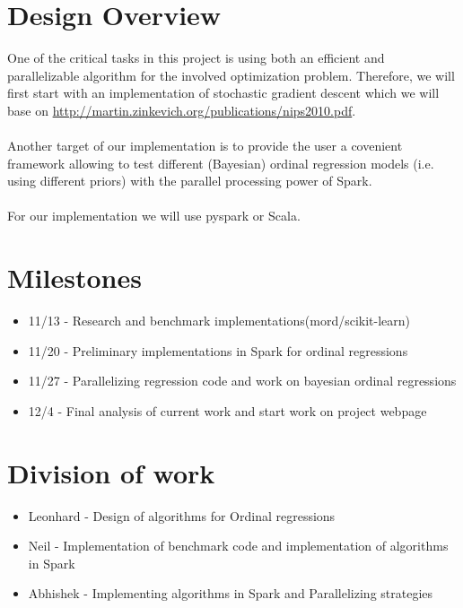 \documentclass{article}
\begin{document}
	\section{Design Overview}
	One of the critical tasks in this project is using both an efficient and parallelizable algorithm for the involved optimization problem. Therefore, we will first start with an implementation of stochastic gradient descent which we will base on \href{Reference}{http://martin.zinkevich.org/publications/nips2010.pdf}.
	\\
	\\
	Another target of our implementation is to provide the user a covenient framework allowing to test different (Bayesian) ordinal regression models (i.e. using different priors) with the parallel processing power of Spark.
	\\
	\\
	For our implementation we will use pyspark or Scala.


	\section{Milestones}
		\begin{itemize}
			\item 11/13 - Research and benchmark implementations(mord/scikit-learn)
			\item 11/20 - Preliminary implementations in Spark for ordinal regressions
			\item 11/27 - Parallelizing regression code and work on bayesian ordinal regressions
			\item 12/4 - Final analysis of current work and start work on project webpage
		\end{itemize}

	\section{Division of work}
		\begin{itemize}
			\item Leonhard - Design of algorithms for Ordinal regressions
			\item Neil - Implementation of benchmark code and implementation of algorithms in Spark
			\item Abhishek - Implementing algorithms in Spark and Parallelizing strategies
		\end{itemize}
\end{document}
